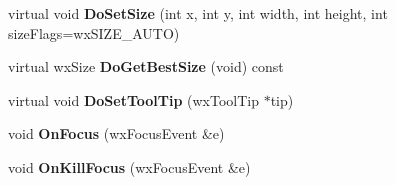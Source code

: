 \begin{DoxyCompactItemize}
\item 
\hypertarget{classwx_spin_ctrl_dbl_ae3ce4d237192006f8bb0f0beda4ce63e}{virtual void {\bfseries Do\+Set\+Size} (int x, int y, int width, int height, int size\+Flags=wx\+S\+I\+Z\+E\+\_\+\+A\+U\+T\+O)}\label{classwx_spin_ctrl_dbl_ae3ce4d237192006f8bb0f0beda4ce63e}

\item 
\hypertarget{classwx_spin_ctrl_dbl_a62b0bcee8a89a53daf9fae9c66c695b9}{virtual wx\+Size {\bfseries Do\+Get\+Best\+Size} (void) const }\label{classwx_spin_ctrl_dbl_a62b0bcee8a89a53daf9fae9c66c695b9}

\item 
\hypertarget{classwx_spin_ctrl_dbl_aa0fa97da8fc1b15f273b796f9907213a}{virtual void {\bfseries Do\+Set\+Tool\+Tip} (wx\+Tool\+Tip $\ast$tip)}\label{classwx_spin_ctrl_dbl_aa0fa97da8fc1b15f273b796f9907213a}

\item 
\hypertarget{classwx_spin_ctrl_dbl_ac255173f418ab779ced79c86009ffb26}{void {\bfseries On\+Focus} (wx\+Focus\+Event \&e)}\label{classwx_spin_ctrl_dbl_ac255173f418ab779ced79c86009ffb26}

\item 
\hypertarget{classwx_spin_ctrl_dbl_a1f7757417848a39b10094d1aa1b87dc8}{void {\bfseries On\+Kill\+Focus} (wx\+Focus\+Event \&e)}\label{classwx_spin_ctrl_dbl_a1f7757417848a39b10094d1aa1b87dc8}

\end{DoxyCompactItemize}
